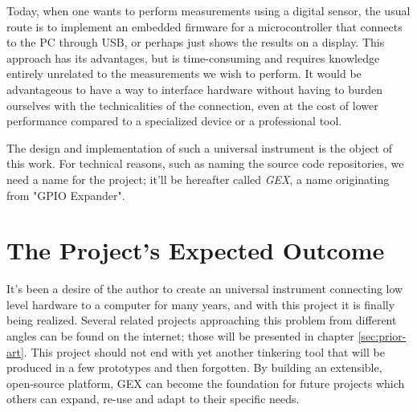 Today, when one wants to perform measurements using a digital sensor, the usual route is to implement an embedded firmware for a microcontroller that connects to the \gls{PC} through \gls{USB}, or perhaps just shows the results on a display. This approach has its advantages, but is time-consuming and requires knowledge entirely unrelated to the measurements we wish to perform. It would be advantageous to have a way to interface hardware without having to burden ourselves with the technicalities of the connection, even at the cost of lower performance compared to a specialized device or a professional tool. 

The design and implementation of such a universal instrument is the object of this work. For technical reasons, such as naming the source code repositories, we need a name for the project; it'll be hereafter called \textit{GEX}, a name originating from "GPIO Expander".

\section{The Project's Expected Outcome}\label{sec:expected-outcome}

It's been a desire of the author to create an universal instrument connecting low level hardware to a computer for many years, and with this project it is finally being realized. Several related projects approaching this problem from different angles can be found on the internet; those will be presented in chapter \ref{sec:prior-art}. This project should not end with yet another tinkering tool that will be produced in a few prototypes and then forgotten. By building an extensible, open-source platform, GEX can become the foundation for future projects which others can expand, re-use and adapt to their specific needs.

